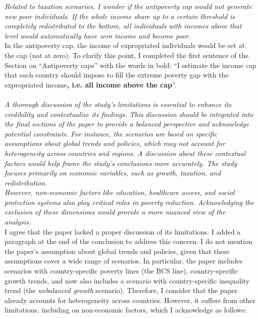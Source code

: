 \documentclass[12pt,english]{article}
\begin{document}
\textit{Related to taxation scenarios, I wonder if the antipoverty cap would not generate new poor individuals. If the whole income share up to a certain threshold is completely redistributed to the bottom, all individuals with incomes above that level would automatically have zero income and become poor. }~\\

In the antipoverty cap, the income of expropriated individuals would be set at the cap (not at zero). To clarify this point, I completed the first sentence of the Section on ``Antipoverty caps'' with the words in bold: ``I estimate the income cap that each country should impose to fill the extreme poverty gap with the expropriated income\textbf{, i.e. all income above the cap}''.
~\\ ~\\

\textit{A thorough discussion of the study's limitations is essential to enhance its credibility and contextualize its findings. This discussion should be integrated into the final sections of the paper to provide a balanced perspective and acknowledge potential constraints. For instance, the scenarios are based on specific assumptions about global trends and policies, which may not account for heterogeneity across countries and regions. A discussion about these contextual factors would help frame the study's conclusions more accurately. The study focuses primarily on economic variables, such as growth, taxation, and redistribution. }~\\
\textit{However, non-economic factors like education, healthcare access, and social protection systems also play critical roles in poverty reduction. Acknowledging the exclusion of these dimensions would provide a more nuanced view of the analysis.}~\\

I agree that the paper lacked a proper discussion of its limitations. I added a paragraph at the end of the conclusion to address this concern. I do not mention the paper's assumption about global trends and policies, given that these assumptions cover a wide range of scenarios. In particular, the paper includes scenarios with country-specific poverty lines (the BCS line), country-specific growth trends, and now also includes a scenario with country-specific inequality trend (the \textit{unbalanced growth} scenario). Therefore, I consider that the paper already accounts for heterogeneity across countries. However, it suffers from other limitations, including on non-economic factors, which I acknowledge as follows:  
\end{document}
